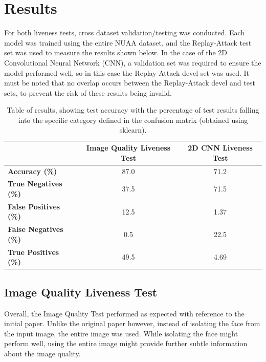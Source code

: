 \documentclass[11pt,a4paper]{article}
\begin{document}
  
\section{Results}
    For both liveness tests, cross dataset validation/testing was conducted. Each model was trained using the entire NUAA dataset, and the Replay-Attack test set
    was used to measure the results shown below. In the case of the 2D Convolutional Neural Network (CNN), a validation set was required to ensure the model performed
    well, so in this case the Replay-Attack devel set was used. It must be noted that no overlap occurs between the Replay-Attack devel and test sets, to prevent the risk
    of these results being invalid.

    \begin{table}[ht]
        \centering
        \begin{tabular}[t]{lcc}
            \toprule
             & \textbf{Image Quality Liveness Test} & \textbf{2D CNN Liveness Test}\\
             \midrule
            \textbf{Accuracy (\%)} & 87.0 & 71.2\\
            \textbf{True Negatives (\%)} & 37.5 & 71.5\\
            \textbf{False Positives (\%)} & 12.5 & 1.37\\
            \textbf{False Negatives (\%)} & 0.5 & 22.5\\
            \textbf{True Positives (\%)} & 49.5 & 4.69\\
            \bottomrule
        \end{tabular}
        \caption{Table of results, showing test accuracy with the percentage of test results falling into the specific category defined in the confusion matrix (obtained using sklearn).}
        \label{ResultsTable}
    \end{table}

    \subsection{Image Quality Liveness Test}
        Overall, the Image Quality Test performed as expected with reference to the initial paper. Unlike the original paper however, instead of isolating the face
        from the input image, the entire image was used. While isolating the face might perform well, using the entire image might provide further subtle information
        about the image quality.
\end{document}

